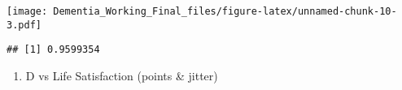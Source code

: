 \documentclass[]{article}
\newenvironment{Shaded}{\begin{snugshade}}{\end{snugshade}}
\newcommand{\CommentTok}[1]{\textcolor[rgb]{0.56,0.35,0.01}{\textit{#1}}}
\newcommand{\KeywordTok}[1]{\textcolor[rgb]{0.13,0.29,0.53}{\textbf{#1}}}
\newcommand{\NormalTok}[1]{#1}
\newcommand{\OperatorTok}[1]{\textcolor[rgb]{0.81,0.36,0.00}{\textbf{#1}}}
\providecommand{\tightlist}{%
  \setlength{\itemsep}{0pt}\setlength{\parskip}{0pt}}
\begin{document}
\texttt{[image: Dementia\_Working\_Final\_files/figure-latex/unnamed-chunk-10-3.pdf]}

\begin{Shaded}
\end{Shaded}

\begin{verbatim}
## [1] 0.9599354
\end{verbatim}

\begin{enumerate}
\def\labelenumi{\alph{enumi}.}
\setcounter{enumi}{1}
\tightlist
\item
  D vs Life Satisfaction (points \& jitter)
\end{enumerate}
\end{document}
